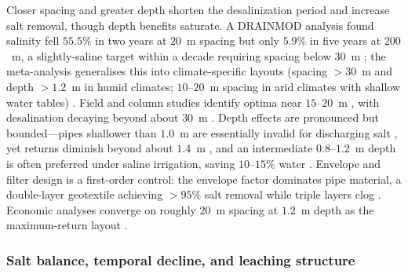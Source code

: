 \documentclass[11pt]{article}
\begin{document}
Closer spacing and greater depth shorten the desalinization period and increase
salt removal, though depth benefits saturate. A DRAINMOD analysis found salinity
fell $55.5\%$ in two years at $20$~m spacing but only $5.9\%$ in five years at
$200$~m, a slightly-saline target within a decade requiring spacing below $30$~m
\parencite{Chen2025}; the meta-analysis generalises this into climate-specific
layouts (spacing $>30$~m and depth $>1.2$~m in humid climates; $10$--$20$~m
spacing in arid climates with shallow water tables) \parencite{Yang2025}. Field
and column studies identify optima near $15$--$20$~m
\parencite{Wang2020,Han2023,Chen2022}, with desalination decaying beyond about
$30$~m \parencite{Zhu2025b}. Depth effects are pronounced but bounded---pipes
shallower than $1.0$~m are essentially invalid for discharging salt
\parencite{Qian2021b}, yet returns diminish beyond about $1.4$~m
\parencite{Bahçeci2007,Bahçeci2006}, and an intermediate $0.8$--$1.2$~m depth is
often preferred under saline irrigation, saving $10$--$15\%$ water
\parencite{Feng2017,Muhammad2021}. Envelope and filter design is a first-order
control: the envelope factor dominates pipe material, a double-layer geotextile
achieving $>95\%$ salt removal while triple layers clog
\parencite{Li2022,Wang2024d,Elzoghby2021}. Economic analyses converge on roughly
$20$~m spacing at $1.2$~m depth as the maximum-return layout \parencite{Chen2025}.

\subsubsection{Salt balance, temporal decline, and leaching structure}
\end{document}
